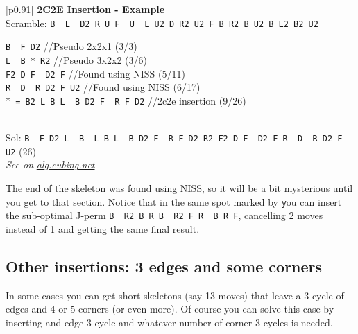 \documentclass[11pt,a4paper]{book}
\newcommand{\p}{\textquotesingle}
\newcommand{\m}{\texttt}
\newcommand{\ps}{\p\,\,}
\newcommand{\comment}[1]{{\color{gray}\quad//#1}}
\begin{document}
\bigskip
\begin{tabular}{|p{}|}
\hline
\textbf{2C2E Insertion - Example}\\
\hline
Scramble: \m{B\ps L\ps D2 R U F\ps U\ps L U2 D R2 U2 F B R2 B U2 B L2 B2 U2}\\
\hline
\begin{minipage}[l]{0.650\textwidth}
\m{B\ps F D2} \comment{Pseudo 2x2x1 (3/3)}\\
\m{L\ps B * R2} \comment{Pseudo 3x2x2 (3/6)}\\
\m{F2 D F\ps D2 F} \comment{Found using NISS (5/11)}\\
\m{R\ps D\ps R D2 F U2} \comment{Found using NISS (6/17)}\\
*\m{ = B2 L B L\ps B D2 F\ps R F D2} \comment{2c2e insertion (9/26)}
\end{minipage}
\begin{minipage}[c]{0.25\textwidth}

\end{minipage}\\
\hline
Sol: \m{B\ps F D2 L\ps B\ps L B L\ps B D2 F\ps R F D2 R2 F2 D F\ps D2 F R\ps D\ps R D2 F U2} (26)\\
\hline
\emph{See on }\href{https://alg.cubing.net/?setup=B-_L-_D2_R_U_F-_U-_L_U2_D_R2_U2_F_B_R2_B_U2_B_L2_B2_U2&alg=B-_F_D2_\%2F\%2FPseudo_2x2x1_(3\%2F3)\%0AL-_B_(B2_L_B_L-_B_D2_F-_R_F_D2)_R2_\%2F\%2FPseudo_3x2x2_(3\%2F6)\%0AF2_D_F-_D2_F_\%2F\%2FFound_using_NISS_(5\%2F11)\%0AR-_D-_R_D2_F_U2_\%2F\%2FFound_using_NISS_(6\%2F17)}{\emph{alg.cubing.net}}\\
\hline
\end{tabular}
\bigskip

The end of the skeleton was found using NISS, so it will be a bit mysterious until you get to that section. Notice that in the same spot marked by \m * you can insert the sub-optimal J-perm \m{B\ps R2 B R B\ps R2 F R\ps B R F\p}, cancelling 2 moves instead of 1 and getting the same final result.

\subsection{Other insertions: 3 edges and some corners}
\label{3enc}

In some cases you can get short skeletons (say 13 moves) that leave a 3-cycle of edges and 4 or 5 corners (or even more). Of course you can solve this case by inserting and edge 3-cycle and whatever number of corner 3-cycles is needed.
\end{document}
